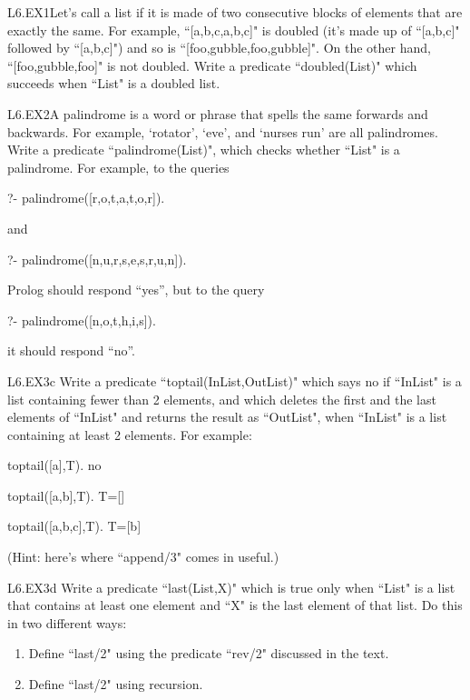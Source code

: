 \begin{LPNexercise}{L6.EX1}Let's call a list 
if it is made of two consecutive blocks of elements that are
exactly the same.
For example, ``[a,b,c,a,b,c]" is doubled (it's
made up of ``[a,b,c]" followed by ``[a,b,c]")
and so is ``[foo,gubble,foo,gubble]". On the other hand,
``[foo,gubble,foo]" is not doubled. Write a predicate
``doubled(List)" which succeeds when ``List"
is a doubled list.\end{LPNexercise}
\begin{LPNexercise}{L6.EX2}A palindrome is a word or phrase that spells the same forwards and
backwards.  For example, `rotator', `eve', and `nurses run' are all
palindromes.  Write a predicate ``palindrome(List)", which checks
whether ``List" is a palindrome. For example, to the queries
\begin{LPNcodedisplay}
?- palindrome([r,o,t,a,t,o,r]).
\end{LPNcodedisplay}
and
\begin{LPNcodedisplay}
?- palindrome([n,u,r,s,e,s,r,u,n]).
\end{LPNcodedisplay}
Prolog should respond ``yes'', but to the query
\begin{LPNcodedisplay}
?- palindrome([n,o,t,h,i,s]).
\end{LPNcodedisplay}
it should respond ``no''.\end{LPNexercise}



\begin{LPNexercise}{L6.EX3c}
Write a predicate ``toptail(InList,OutList)" which says
no if ``InList" is a list containing fewer than 2 elements, and
which deletes the first and the last elements of ``InList" and
returns the result as ``OutList", when ``InList" is a
list containing at least 2 elements. For example:
\begin{LPNcodedisplay}
    toptail([a],T).
    no

    toptail([a,b],T).
    T=[]

    toptail([a,b,c],T).
    T=[b]
\end{LPNcodedisplay}

(Hint: here's where ``append/3" comes in useful.)
\end{LPNexercise}

\begin{LPNexercise}{L6.EX3d}
Write a predicate ``last(List,X)" which is true only when ``List" is a
list that contains at least one element and ``X" is the last element of
that list. Do this in two different ways:
\begin{enumerate}
\item Define ``last/2" using the predicate ``rev/2" discussed in the text.
\item Define ``last/2" using recursion.
\end{enumerate}
\end{LPNexercise}

